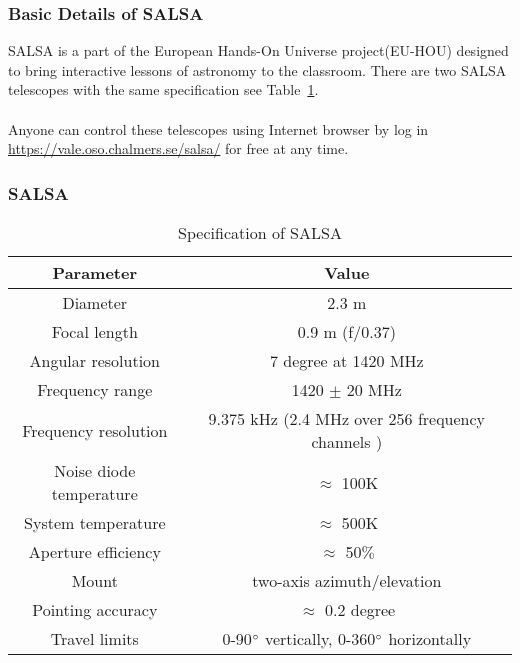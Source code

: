 \documentclass{beamer}
\begin{document}
\begin{frame}
\frametitle{Basic Details of SALSA}
SALSA is a part of the European Hands-On Universe project(EU-HOU)\cite{Ferlet2006} designed to bring interactive lessons of astronomy to the classroom\cite{SALSAS2018}. There are two SALSA telescopes with the same specification see Table~\ref{Tab:salsa_specification}\cite{ThomasBensby2017}.\\~\\ 
Anyone can control these telescopes using Internet browser by log in \url{https://vale.oso.chalmers.se/salsa/} for free at any time.
\end{frame}

\begin{frame}
\frametitle{SALSA}
\begin{table}
\begin{tabular}{|c|c|}
\hline
\textbf{Parameter}&\multicolumn{1}{|c|}{\textbf{Value}} \\
\cline{1-2} 
\hline
Diameter & 2.3 m\\
\hline
Focal length & 0.9 m (f/0.37)\\
\hline
Angular resolution & 7 degree at 1420 MHz\\
\hline
Frequency range & 1420 $\pm$ 20 MHz\\
\hline
Frequency resolution & 9.375 kHz (2.4 MHz over 256 frequency channels )\\
\hline
Noise diode temperature & $\approx$ 100K\\
\hline
System temperature & $\approx$ 500K\\
\hline
Aperture efficiency & $\approx$ 50$\%$\\
\hline
Mount & two-axis azimuth/elevation\\
\hline
Pointing accuracy & $\approx$ 0.2 degree\\
\hline
Travel limits &  0-90$\degree$ vertically, 0-360$\degree$ horizontally\\
\hline
\end{tabular}
\label{Tab:salsa_specification}
\caption{Specification of SALSA}
\end{table}
\end{frame}
\end{document}
